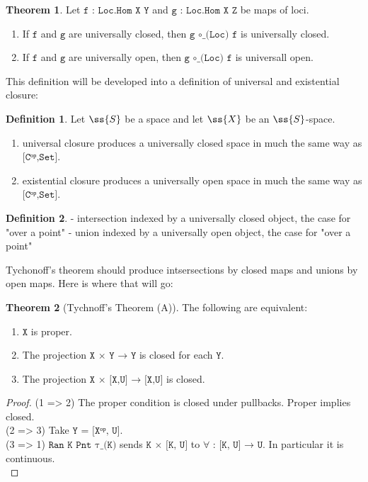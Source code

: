 \documentclass{book}
\theoremstyle{definition}
\newtheorem{definition}{Definition}
\newtheorem{theorem}{Theorem}
\begin{document}
\begin{theorem}
Let $\texttt{f : Loc.Hom X Y}$ and $\texttt{g : Loc.Hom X Z}$ be maps of loci.
\begin{enumerate}
\item If $\texttt{f}$ and $\texttt{g}$ are universally closed, then $\texttt{g ∘\_(Loc) f}$ is universally closed.
\item If $\texttt{f}$ and $\texttt{g}$ are universally open, then $\texttt{g ∘\_(Loc) f}$ is universall open. 
\end{enumerate}
\end{theorem}

This definition will be developed into a definition of universal and existential closure:

\begin{definition}
Let $\ss{S}$ be a space and let $\ss{X}$ be an $\ss{S}$-space. 
\begin{enumerate}
\item universal closure produces a universally closed space in much the same way as $\texttt{[Cᵒᵖ,Set]}$.
\item existential closure produces a universally open space in much the same way as $\texttt{[Cᵒᵖ,Set]}$.
\end{enumerate}
\end{definition}

\begin{definition}
- intersection indexed by a universally closed object, the case for "over a point"
- union indexed by a universally open object, the case for "over a point"
\end{definition}

Tychonoff's theorem should produce intsersections by closed maps and unions by open maps. Here is where that will go:

\begin{theorem}[Tychnoff's Theorem (A)]
The following are equivalent:
\begin{enumerate}
\item $\texttt{X}$ is proper.
\item The projection $\texttt{X × Y → Y}$ is closed for each $\texttt{Y}$.
\item The projection $\texttt{X × [X,U] → [X,U]}$ is closed. 
\end{enumerate}
\end{theorem}

\begin{proof}

(1 => 2) The proper condition is closed under pullbacks. Proper implies closed.\\

(2 => 3) Take $\texttt{Y = [Xᵒᵖ, U]}$.\\

(3 => 1)  $\texttt{Ran K Pnt τ\_(K)}$ sends $\texttt{K × [K, U]}$ to $\texttt{∀ : [K, U] → U}$. In particular it is continuous.\\

\end{proof}
\end{document}
